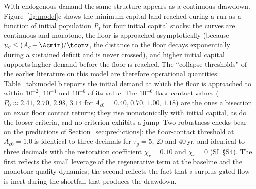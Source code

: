 With endogenous demand the same structure appears as a continuous drawdown. Figure~\ref{fig:model}c shows the minimum capital land reached during a run as a function of initial population $P_0$ for four initial capital stocks: the curves are continuous and monotone, the floor is approached asymptotically (because $u_c\le(A_c-\Acmin)/\tconv$, the distance to the floor decays exponentially during a sustained deficit and is never crossed), and higher initial capital supports higher demand before the floor is reached. The ``collapse thresholds'' of the earlier literature on this model are therefore operational quantities: Table~\ref{tab:model}b reports the initial demand at which the floor is approached to within $10^{-2}$, $10^{-4}$ and $10^{-6}$ of its value. The $10^{-6}$ floor-contact values ($P_0\approx2.41,\,2.70,\,2.98,\,3.14$ for $A_{c0}=0.40,\,0.70,\,1.00,\,1.18$) are the ones a bisection on exact floor contact returns; they rise monotonically with initial capital, as do the looser criteria, and no criterion exhibits a jump. Two robustness checks bear on the predictions of Section~\ref{sec:predictions}: the floor-contact threshold at $A_{c0}=1.0$ is identical to three decimals for $\tau_g=5$, $20$ and $40$\,yr, and identical to three decimals with the restoration coefficient $\chi_r=0.10$ and $\chi_r=0$ (SI~\S S4). The first reflects the small leverage of the regenerative term at the baseline and the monotone quality dynamics; the second reflects the fact that a surplus-gated flow is inert during the shortfall that produces the drawdown.


